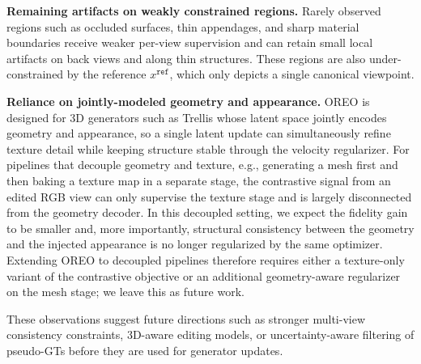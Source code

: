 \documentclass[runningheads]{llncs}
\begin{document}
\textbf{Remaining artifacts on weakly constrained regions.}
Rarely observed regions such as occluded surfaces, thin appendages, and sharp material boundaries receive weaker per-view supervision and can retain small local artifacts on back views and along thin structures.
These regions are also under-constrained by the reference $x^{\texttt{ref}}$, which only depicts a single canonical viewpoint.

\textbf{Reliance on jointly-modeled geometry and appearance.}
OREO is designed for 3D generators such as Trellis whose latent space jointly encodes geometry and appearance, so a single latent update can simultaneously refine texture detail while keeping structure stable through the velocity regularizer.
For pipelines that decouple geometry and texture, e.g., generating a mesh first and then baking a texture map in a separate stage, the contrastive signal from an edited RGB view can only supervise the texture stage and is largely disconnected from the geometry decoder.
In this decoupled setting, we expect the fidelity gain to be smaller and, more importantly, structural consistency between the geometry and the injected appearance is no longer regularized by the same optimizer.
Extending OREO to decoupled pipelines therefore requires either a texture-only variant of the contrastive objective or an additional geometry-aware regularizer on the mesh stage; we leave this as future work.

These observations suggest future directions such as stronger multi-view consistency constraints, 3D-aware editing models, or uncertainty-aware filtering of pseudo-GTs before they are used for generator updates.



\end{document}
